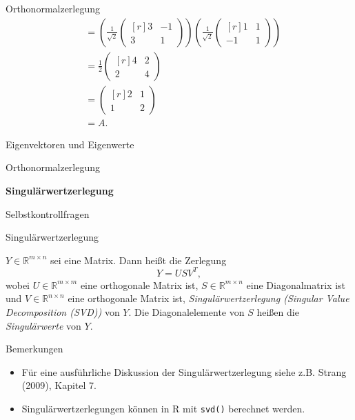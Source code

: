 \documentclass[
  8pt,
  ignorenonframetext,
]{beamer}
\providecommand{\tightlist}{%
  \setlength{\itemsep}{0pt}\setlength{\parskip}{0pt}}
\begin{document}
\begin{frame}{Orthonormalzerlegung}
\begin{align*}
& =
\left(
\frac{1}{\sqrt{2}}
\begin{pmatrix*}[r]
3 & -1 \\
3 &  1
\end{pmatrix*}
\right)
\left(
\frac{1}{\sqrt{2}}
\begin{pmatrix*}[r]
 1 &  1 \\
-1 &  1
\end{pmatrix*}
\right)
\\
& =
\frac{1}{2}
\begin{pmatrix*}[r]
4 & 2 \\
2 & 4
\end{pmatrix*} \\
& =
\begin{pmatrix*}[r]
2 & 1 \\
1 & 2
\end{pmatrix*} \\
& = A.
\end{align*}
\end{frame}

\begin{frame}{}
\protect\hypertarget{section-5}{}
\vfill
{}
\Large

Eigenvektoren und Eigenwerte

Orthonormalzerlegung

\textbf{Singulärwertzerlegung}

Selbstkontrollfragen \vfill 
\end{frame}

\begin{frame}[fragile]{Singulärwertzerlegung}
\protect\hypertarget{singuluxe4rwertzerlegung}{}
\small
\begin{definition}[Singulärwertzerlegung]
\justifying
$Y \in \mathbb{R}^{m \times n}$ sei eine Matrix. Dann heißt die Zerlegung
\begin{equation}
Y = USV^T,
\end{equation}
wobei $U \in \mathbb{R}^{m \times m}$ eine orthogonale Matrix ist, $S \in \mathbb{R}^{m \times n}$
eine Diagonalmatrix ist und $V \in \mathbb{R}^{n \times n}$ eine orthogonale Matrix ist,
\textit{Singulärwertzerlegung (Singular Value Decomposition (SVD))} von $Y$. Die
Diagonalelemente von  $S$ heißen die  \textit{Singulärwerte} von $Y$.
\end{definition}

\footnotesize

Bemerkungen

\begin{itemize}
\tightlist
\item
  Für eine ausführliche Diskussion der Singulärwertzerlegung siehe z.B.
  Strang (2009), Kapitel 7.
\item
  Singulärwertzerlegungen können in R mit \texttt{svd()} berechnet
  werden.
\end{itemize}
\end{frame}
\end{document}
